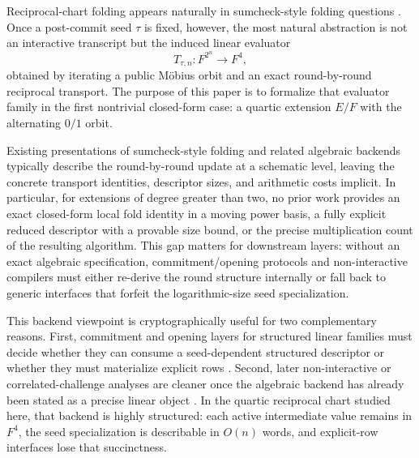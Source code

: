 \documentclass[11pt]{article}
\begin{document}
Reciprocal-chart folding appears naturally in sumcheck-style folding questions \cite{LFKN92,BootleChiesaSotiraki2021}. Once a post-commit seed \(\tau\) is fixed, however, the most natural abstraction is not an interactive transcript but the induced linear evaluator
\[
T_{\tau,n}:F^{2^n}\to F^4,
\]
obtained by iterating a public M\"obius orbit and an exact round-by-round reciprocal transport. The purpose of this paper is to formalize that evaluator family in the first nontrivial closed-form case: a quartic extension \(E/F\) with the alternating \(0/1\) orbit.

Existing presentations of sumcheck-style folding \cite{LFKN92,BootleChiesaSotiraki2021} and related algebraic backends typically describe the round-by-round update at a schematic level, leaving the concrete transport identities, descriptor sizes, and arithmetic costs implicit. In particular, for extensions of degree greater than two, no prior work provides an exact closed-form local fold identity in a moving power basis, a fully explicit reduced descriptor with a provable size bound, or the precise multiplication count of the resulting algorithm. This gap matters for downstream layers: without an exact algebraic specification, commitment/opening protocols and non-interactive compilers must either re-derive the round structure internally or fall back to generic interfaces that forfeit the logarithmic-size seed specialization.

This backend viewpoint is cryptographically useful for two complementary reasons. First, commitment and opening layers for structured linear families must decide whether they can consume a seed-dependent structured descriptor or whether they must materialize explicit rows \cite{CampanelliEtAl2022LMVC,CatalanoFioreTucker2022AHFC,BalbasCatalanoFioreLai2022CFC,FischLiuVesely2024Orbweaver}. Second, later non-interactive or correlated-challenge analyses are cleaner once the algebraic backend has already been stated as a precise linear object \cite{CanettiEtAl2018FS,BlockEtAl2023FRI}. In the quartic reciprocal chart studied here, that backend is highly structured: each active intermediate value remains in \(F^4\), the seed specialization is describable in \(O(n)\) words, and explicit-row interfaces lose that succinctness.
\end{document}
